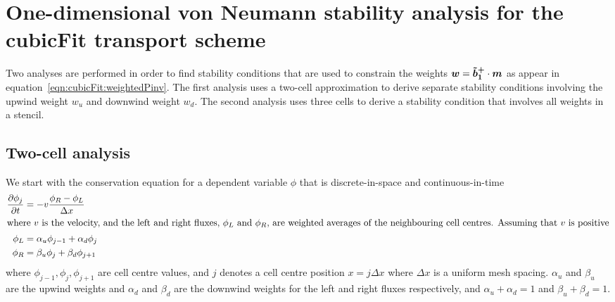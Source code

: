 \chapter{One-dimensional von Neumann stability analysis for the cubicFit transport scheme}
\label{app:vonNeumann}

Two analyses are performed in order to find stability conditions that are used to constrain the weights $\bm{w} = \bm{\tilde{b}_1^+} \cdot \bm{m}$ as appear in equation~\eqref{eqn:cubicFit:weightedPinv}.  The first analysis uses a two-cell approximation to derive separate stability conditions involving the upwind weight $w_u$ and downwind weight $w_d$.  The second analysis uses three cells to derive a stability condition that involves all weights in a stencil.

\section*{Two-cell analysis}
We start with the conservation equation for a dependent variable $\phi$ that is discrete-in-space and continuous-in-time
\begin{align}
\frac{\partial \phi_j}{\partial t} &= - v \frac{\phi_R - \phi_L}{\Delta x} \label{eqn:vonNeumann:advectionLR} \\
%
\intertext{where $v$ is the velocity, and the left and right fluxes, $\phi_L$ and $\phi_R$, are weighted averages of the neighbouring cell centres.  Assuming that $v$ is positive}
%
\phi_L &= \alpha_u \phi_{j-1} + \alpha_d \phi_j \\
\phi_R &= \beta_u \phi_j + \beta_d \phi_{j+1}
\end{align}
where $\phi_{j-1}, \phi_j, \phi_{j+1}$ are cell centre values, and $j$ denotes a cell centre position $x = j \Delta x$ where $\Delta x$ is a uniform mesh spacing.
$\alpha_u$ and $\beta_u$ are the upwind weights and $\alpha_d$ and $\beta_d$ are the downwind weights for the left and right fluxes respectively, and $\alpha_u + \alpha_d = 1$ and $\beta_u + \beta_d = 1$.

